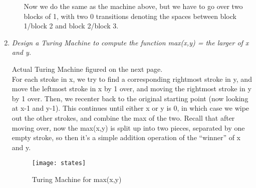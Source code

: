 \begin{enumerate}
\begin{itemize}
        \begin{figure}[H]
        \end{figure}

        Now we do the same as the machine above, but we have to go over two blocks of 1, with two 0 transitions denoting the spaces between block 1/block 2 and block 2/block 3.

    \end{itemize}
  \item 
    {\it
      Design a Turing Machine to compute the function max(x,y) = the larger of x and y.
    }

    Actual Turing Machine figured on the next page. \\

    For each stroke in x, we try to find a corresponding rightmost stroke in y, and move the leftmost stroke in x by 1 over, and moving the rightmost stroke in y by 1 over. Then, we recenter back to the original starting point (now looking at x-1 and y-1). This continues until either x or y is 0, in which case we wipe out the other strokes, and combine the max of the two. Recall that after moving over, now the max(x,y) is split up into two pieces, separated by one empty stroke, so then it's a simple addition operation of the ``winner'' of x and y.

    \begin{figure}[!htbp]
      \caption{Turing Machine for max(x,y)}
      \centering
      \texttt{[image: states]}
    \end{figure}
    
\end{enumerate}


